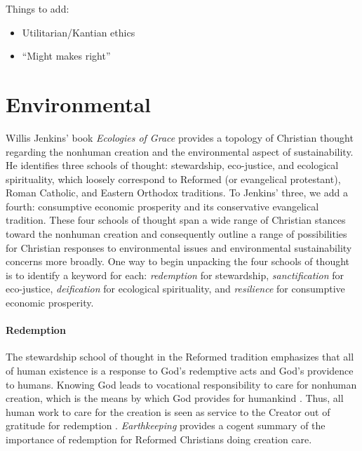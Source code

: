 \documentclass[12pt]{article}
\begin{document}
Things to add:

\begin{itemize}

  \item Utilitarian/Kantian ethics

  \item ``Might makes right''

\end{itemize}


\section{Environmental}
\label{sec:environmental}

Willis Jenkins' book \emph{Ecologies of Grace} \autocite{Jenkins:2008}
provides a topology of Christian thought regarding the 
nonhuman creation and the
environmental aspect of sustainability.
He identifies three schools of thought:
stewardship, 
eco-justice, and 
ecological spirituality,
which loosely correspond to 
Reformed (or evangelical protestant), 
Roman Catholic, and 
Eastern Orthodox 
traditions.
To Jenkins' three, we add a fourth:
consumptive economic prosperity and
its conservative evangelical tradition. 
These four schools of thought 
span a wide range of Christian stances toward the nonhuman creation
and 
consequently outline a range of possibilities 
for Christian responses to environmental issues
and environmental sustainability concerns more broadly.
One way to begin unpacking the four schools of thought 
is to identify a keyword for each:
\emph{redemption} for stewardship, 
\emph{sanctification} for eco-justice,
\emph{deification} for ecological spirituality, and
\emph{resilience} for consumptive economic prosperity.

\paragraph{Redemption} 
\label{sec:redemption}

The stewardship school of thought in the Reformed tradition
emphasizes that all of human existence
is a response to God's redemptive acts
and God's providence to humans.
Knowing God leads to vocational responsibility 
to care for nonhuman creation,
which is the means by which God provides for humankind \autocite{Jenkins:2008} \autocite[19]{Jenkins:2008}. 
Thus, all human work to care for the creation 
is seen as service to the Creator
out of gratitude for redemption \autocite[77]{Jenkins:2008}.
\emph{Earthkeeping} \autocite{Wilkenson:1980aa} provides a cogent summary
of the importance of redemption for Reformed Christians doing creation care.
\end{document}
